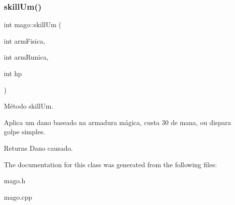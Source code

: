 \subsubsection{\texorpdfstring{skill\+Um()}{skillUm()}}
{\footnotesize\ttfamily int mago\+::skill\+Um (\begin{DoxyParamCaption}\item[{int}]{arm\+Fisica,  }\item[{int}]{arm\+Runica,  }\item[{int}]{hp }\end{DoxyParamCaption})}



Método skill\+Um. 

Aplica um dano baseado na armadura mágica, custa 30 de mana, ou dispara golpe simples. \begin{DoxyReturn}{Returns}
Dano causado. 
\end{DoxyReturn}


The documentation for this class was generated from the following files\+:\begin{DoxyCompactItemize}
\item 
mago.\+h\item 
mago.\+cpp\end{DoxyCompactItemize}
